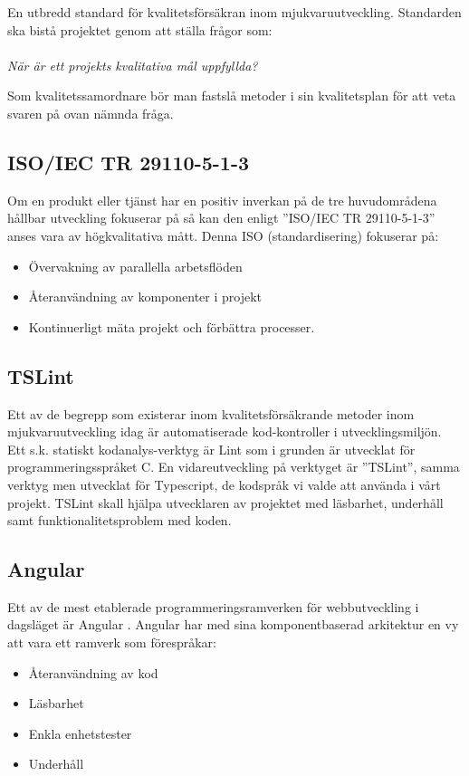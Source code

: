 En utbredd standard för kvalitetsförsäkran inom mjukvaruutveckling. Standarden ska bistå projektet genom att ställa frågor som:
\\ \\
\emph{När är ett projekts kvalitativa mål uppfyllda?}

Som kvalitetssamordnare bör man fastslå metoder i sin kvalitetsplan för att veta svaren på ovan nämnda fråga. \\


\subsection{ISO/IEC TR 29110-5-1-3}
Om en produkt eller tjänst har en positiv inverkan på de tre huvudområdena hållbar utveckling fokuserar på så kan den enligt ”ISO/IEC TR 29110-5-1-3” \cite{ISOtor} anses vara av högkvalitativa mått.  Denna ISO (standardisering) fokuserar på: 

\begin{itemize}
	\item Övervakning av parallella arbetsflöden
	\item Återanvändning av komponenter i projekt
	\item Kontinuerligt mäta projekt och förbättra processer.
\end{itemize}


\subsection{TSLint}
Ett av de begrepp som existerar inom kvalitetsförsäkrande metoder inom mjukvaruutveckling idag är automatiserade kod-kontroller i utvecklingsmiljön.
Ett s.k. statiskt kodanalys-verktyg är Lint som i grunden är utvecklat för programmeringsspråket C. En vidareutveckling på verktyget är ”TSLint”, samma verktyg men utvecklat för Typescript, de kodspråk vi valde att använda i vårt projekt. TSLint skall hjälpa utvecklaren av projektet med läsbarhet, underhåll samt funktionalitetsproblem med koden.

\subsection{Angular}
Ett av de mest etablerade programmeringsramverken för webbutveckling i dagsläget är Angular \cite{altexsoft}. Angular har med sina komponentbaserad arkitektur en vy att vara ett ramverk som förespråkar:

\begin{itemize}
	\item Återanvändning av kod
	\item Läsbarhet
	\item Enkla enhetstester
	\item Underhåll
\end{itemize}


